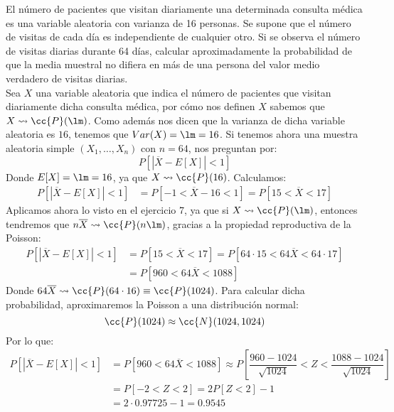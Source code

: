 \begin{ejercicio}
    El número de pacientes que visitan diariamente una determinada consulta médica es una variable aleatoria con varianza de 16 personas. Se supone que el número de visitas de cada día es independiente de cualquier otro. Si se observa el número de visitas diarias durante 64 días, calcular aproximadamente la probabilidad de que la media muestral no difiera en más de una persona del valor medio verdadero de visitas diarias.\\

    \noindent
    Sea $X$ una variable aleatoria que indica el número de pacientes que visitan diariamente dicha consulta médica, por cómo nos definen $X$ sabemos que $X\rightsquigarrow\cc{P}(\lm)$. Como además nos dicen que la varianza de dicha variable aleatoria es $16$, tenemos que $Var(X) = \lm = 16$. Si tenemos ahora una muestra aleatoria simple $(X_1, \ldots, X_n)$ con $n=64$, nos preguntan por:
    \begin{equation*}
        P[|\overline{X} - E[X]| < 1]
    \end{equation*}
    Donde $E[X] = \lm = 16$, ya que $X\rightsquigarrow\cc{P}(16)$. Calculamos:
    \begin{align*}
        P[|\overline{X} - E[X]| < 1] &= P[-1 < \overline{X}-16 < 1] = P[15 < \overline{X} < 17]
    \end{align*}
    Aplicamos ahora lo visto en el ejercicio 7, ya que si $X\rightsquigarrow\cc{P}(\lm)$, entonces tendremos que $n\overline{X}\rightsquigarrow \cc{P}(n\lm)$, gracias a la propiedad reproductiva de la Poisson:
    \begin{align*}
        P[|\overline{X} - E[X]| < 1] &= P[15 < \overline{X} < 17] = P[64\cdot 15 < 64\overline{X}<64\cdot 17] \\
                                     &= P[960 < 64\overline{X} < 1088]
    \end{align*}
    Donde $64\overline{X}\rightsquigarrow\cc{P}(64\cdot 16) \equiv \cc{P}(1024)$. Para calcular dicha probabilidad, aproximaremos la Poisson a una distribución normal:
    \begin{equation*}
        \cc{P}(1024) \approx \cc{N}(1024, 1024)
    \end{equation*}
    Por lo que:
    \begin{align*}
        P[|\overline{X} - E[X]| < 1] &= P[960 < 64\overline{X} < 1088] \approx P\left[\dfrac{960-1024}{\sqrt{1024}} < Z < \dfrac{1088 - 1024}{\sqrt{1024}}\right] \\
                                     &= P[-2 < Z < 2] = 2P[Z<2] -1  \\
                                     &= 2\cdot 0.97725 - 1 = 0.9545
    \end{align*}
\end{ejercicio}

